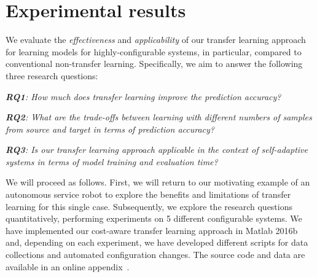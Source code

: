 
\section{Experimental results}
\label{sec:evaluation}

We evaluate the \emph{effectiveness} and \emph{applicability} of our transfer learning approach for learning models for highly-configurable systems, in particular, compared to conventional non-transfer learning. Specifically, we aim to answer the following three research questions:

{\noindent \em \textbf{RQ1}: How much does transfer learning improve the prediction accuracy?} %

{\noindent \em \textbf{RQ2}: What are the trade-offs between learning with different numbers of samples from source and target in terms of prediction accuracy?}

{\noindent \em \textbf{RQ3}: Is our transfer learning approach applicable in the context of self-adaptive systems in terms of model training and evaluation time?}

We will proceed as follows. First, we will return to our motivating example of an autonomous service robot to explore
the benefits and limitations of transfer learning for this single case. Subsequently, we
explore the research questions quantitatively, performing experiments on 5 different configurable systems.
We have implemented our cost-aware transfer learning approach in Matlab 2016b and, depending on each experiment, we have developed different scripts for data collections and automated configuration changes. The source code and data are available in an online appendix~\cite{onlineappendix}.





